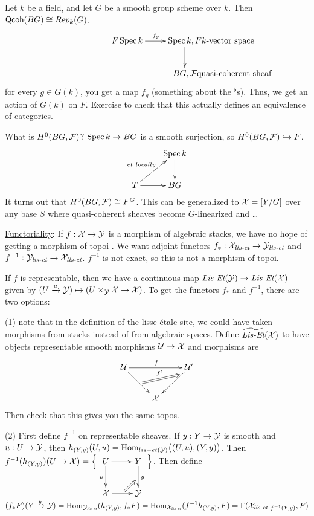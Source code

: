 \begin{example}
  Let $k$ be a field, and let $G$ be a smooth group scheme over $k$.
Then $\text{\sf Qcoh}(BG)\cong Rep_k(G)$.
  \[\xymatrix{
   F \spec k\ar[r]^{f_g}& \spec k, F \rlap{$k$-vector space}\ar[d]  \\
   & BG, \F \rlap{quasi-coherent sheaf}
  }\]
  for every $g\in G(k)$, you get a map $f_g$ (something about the
${}^\flat$s). Thus, we get an action of $G(k)$ on $F$. Exercise to
check that this actually defines an equivalence of categories.

  What is $H^0(BG,\mathcal{F})$? $\operatorname{Spec} k\to BG$ is a smooth surjection, so
$H^0(BG,\mathcal{F})\hookrightarrow F$.
  \[\xymatrix{
    & \spec k\ar[d]\\
   T\ar[r]\ar[ur]^{et\ locally} & BG
  }\]
  It turns out that $H^0(BG,\mathcal{F})\cong F^G$. This can be generalized to
$\mathcal{X}=[Y/G]$ over any base $S$ where quasi-coherent sheaves become
$G$-linearized and \dots
\end{example}
\underline{Functoriality}: If $f:\mathcal{X}\to \mathcal{Y}$ is a morphism of algebraic
stacks, we have no hope of getting a morphism of topoi . We want adjoint functors $f_*:\mathcal{X}_{\text{\it lis-et}} \to
\mathcal{Y}_{\text{\it lis-et}} $ and $f^{-1}:\mathcal{Y}_{\text{\it lis-et}} \to \mathcal{X}_{\text{\it lis-et}} $. $f^{-1}$ is not
exact, so this is not a morphism of topoi.
 
If $f$ is representable, then we have a continuous map $\text{\it Lis-Et}(\mathcal{Y})\to
\text{\it Lis-Et}(\mathcal{X})$ given by $(U\xrightarrow u \mathcal{Y})\mapsto (U\times_{\mathcal{Y}} \mathcal{X}\to
\mathcal{X})$. To get the functors $f_*$ and $f^{-1}$, there are two options:

(1) note that in the definition of the lisse-\'etale site, we could
have taken morphisms from stacks instead of from algebraic spaces.
Define $\widetilde{\text{\it Lis-Et}}(\mathcal{X})$ to have objects representable smooth
morphisms $\mathcal{U}\to \mathcal{X}$ and morphisms are
\[\xymatrix{
 \U\ar[rr]^f \ar[dr]^{}="a" & & \U'\ar[dl]_(.2){}="b"\\
 & \X
 \ar@{=>}^{f^\flat} "a";"b"
}\]
Then check that this gives you the same topos.

(2) First define $f^{-1}$ on representable sheaves. If $y:Y\to \mathcal{Y}$ is
smooth and $u:U\to \mathcal{Y}$, then
$h_{(Y,y)}(U,u)=\operatorname{Hom}_{lis-et(\mathcal{Y})}\bigl((U,u),(Y,y)\bigr)$. Then
$f^{-1}(h_{(Y,y)})(U\to \X)=\Bigl\{ \xymatrix{U\ar[d]_u \ar[r] &
Y\ar[d]^y_{}="b"\\ \X\ar[r]^{}="a" & \Y \ar@{=>} "a";"b"}\Bigr\}$.
Then define $(f_*F)(Y\xrightarrow y \mathcal{Y}) = \operatorname{Hom}_{\mathcal{Y}_{\text{\it lis-et}}
}(h_{(Y,y)},f_*F) = \operatorname{Hom}_{\mathcal{X}_{\text{\it lis-et}}
}(f^{-1}h_{(Y,y)},F)=\Gamma(\mathcal{X}_{\text{\it lis-et}} |_{f^{-1}(Y,y)},F)$

